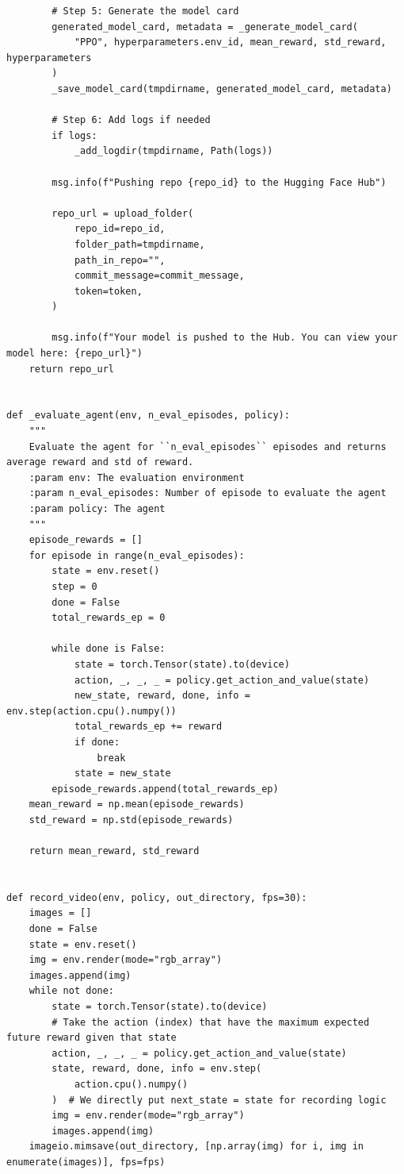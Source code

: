 \documentclass[11pt,a4paper]{article}
\begin{document}
\begin{lstlisting}
        # Step 5: Generate the model card
        generated_model_card, metadata = _generate_model_card(
            "PPO", hyperparameters.env_id, mean_reward, std_reward, hyperparameters
        )
        _save_model_card(tmpdirname, generated_model_card, metadata)

        # Step 6: Add logs if needed
        if logs:
            _add_logdir(tmpdirname, Path(logs))

        msg.info(f"Pushing repo {repo_id} to the Hugging Face Hub")

        repo_url = upload_folder(
            repo_id=repo_id,
            folder_path=tmpdirname,
            path_in_repo="",
            commit_message=commit_message,
            token=token,
        )

        msg.info(f"Your model is pushed to the Hub. You can view your model here: {repo_url}")
    return repo_url


def _evaluate_agent(env, n_eval_episodes, policy):
    """
    Evaluate the agent for ``n_eval_episodes`` episodes and returns average reward and std of reward.
    :param env: The evaluation environment
    :param n_eval_episodes: Number of episode to evaluate the agent
    :param policy: The agent
    """
    episode_rewards = []
    for episode in range(n_eval_episodes):
        state = env.reset()
        step = 0
        done = False
        total_rewards_ep = 0

        while done is False:
            state = torch.Tensor(state).to(device)
            action, _, _, _ = policy.get_action_and_value(state)
            new_state, reward, done, info = env.step(action.cpu().numpy())
            total_rewards_ep += reward
            if done:
                break
            state = new_state
        episode_rewards.append(total_rewards_ep)
    mean_reward = np.mean(episode_rewards)
    std_reward = np.std(episode_rewards)

    return mean_reward, std_reward


def record_video(env, policy, out_directory, fps=30):
    images = []
    done = False
    state = env.reset()
    img = env.render(mode="rgb_array")
    images.append(img)
    while not done:
        state = torch.Tensor(state).to(device)
        # Take the action (index) that have the maximum expected future reward given that state
        action, _, _, _ = policy.get_action_and_value(state)
        state, reward, done, info = env.step(
            action.cpu().numpy()
        )  # We directly put next_state = state for recording logic
        img = env.render(mode="rgb_array")
        images.append(img)
    imageio.mimsave(out_directory, [np.array(img) for i, img in enumerate(images)], fps=fps)



\end{lstlisting}
\end{document}
